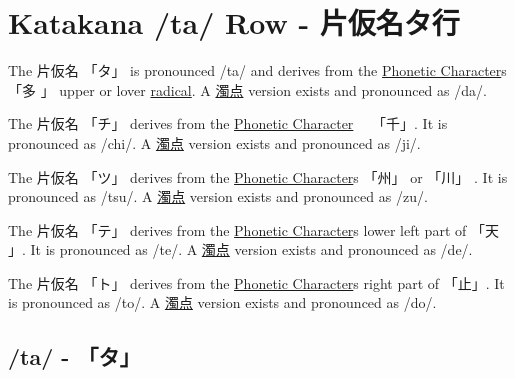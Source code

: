 \section{Katakana /ta/ Row - 片仮名タ行}\label{sec:KatakanaTaRow}


\label{letter:ta} The  片仮名 {「タ」} is pronounced  /ta/ and
derives from the \hyperref[sec:PhoneticCharacter]{Phonetic Character}s {「多 」}
upper or lover \hyperref[sec:Radical]{radical}.  A \hyperref[sec:Dakuten]{濁点}
version exists and pronounced as /da/.

\label{letter:chi} The 片仮名 {「チ」} derives from the
\hyperref[sec:PhoneticCharacter]{Phonetic Character}　 {「千」}.  It is
pronounced as /chi/.  A \hyperref[sec:Dakuten]{濁点} version exists and
pronounced as /ji/.

\label{letter:tsu} The 片仮名 {「ツ」} derives from the
\hyperref[sec:PhoneticCharacter]{Phonetic Character}s {「州」} or {「川」} .  It
is pronounced as /tsu/.  A \hyperref[sec:Dakuten]{濁点} version exists and
pronounced as /zu/. 

\label{letter:te} The 片仮名 {「テ」} derives from the
\hyperref[sec:PhoneticCharacter]{Phonetic Character}s lower left part of {「天
」}.  It is pronounced as /te/.  A \hyperref[sec:Dakuten]{濁点} version exists
and pronounced as /de/.  

\newpage

\label{letter:to} The 片仮名 {「ト」} derives from the
\hyperref[sec:PhoneticCharacter]{Phonetic Character}s right part of {「止」}.
It is pronounced as /to/.  A \hyperref[sec:Dakuten]{濁点} version exists and
pronounced as /do/.

 

\newpage

\subsection{/ta/ - 「タ」}\label{sec:KatakanaTa}



